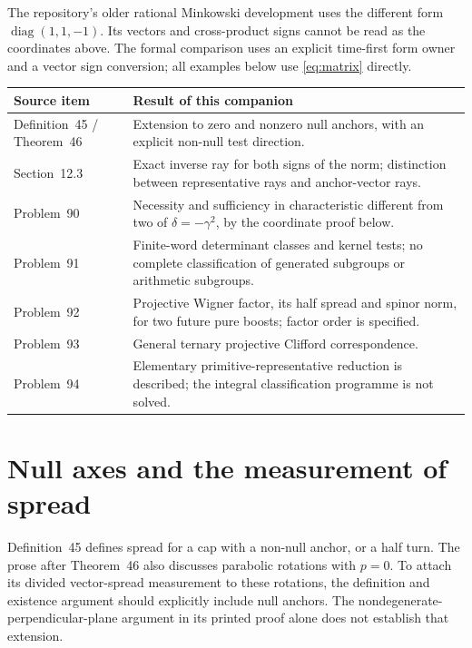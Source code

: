\documentclass[11pt]{article}
\theoremstyle{remark}
\begin{document}
The repository's older rational Minkowski development uses the different
form \(\operatorname{diag}(1,1,-1)\). Its vectors and cross-product signs
cannot be read as the coordinates above. The formal comparison uses an
explicit time-first form owner and a vector sign conversion; all examples
below use \eqref{eq:matrix} directly.

\begin{center}
\begin{tabular}{>{\raggedright\arraybackslash}p{}>{\raggedright\arraybackslash}p{}}
\toprule
Source item & Result of this companion \\
\midrule
Definition~45 / Theorem~46 & Extension to zero and nonzero null anchors,
with an explicit non-null test direction. \\
Section~12.3 & Exact inverse ray for both signs of the norm; distinction
between representative rays and anchor-vector rays. \\
Problem~90 & Necessity and sufficiency in characteristic different from two of
\(\delta=-\gamma^2\), by the coordinate proof below. \\
Problem~91 & Finite-word determinant classes and kernel tests; no complete
classification of generated subgroups or arithmetic subgroups. \\
Problem~92 & Projective Wigner factor, its half spread and spinor norm,
for two future pure boosts; factor order is specified. \\
Problem~93 & General ternary projective Clifford correspondence. \\
Problem~94 & Elementary primitive-representative reduction is described;
the integral classification programme is not solved. \\
\bottomrule
\end{tabular}
\end{center}

\section{Null axes and the measurement of spread}

Definition~45 defines spread for a cap with a non-null anchor, or a half turn.
The prose after Theorem~46 also discusses parabolic rotations with \(p=0\).
To attach its divided vector-spread measurement to these rotations, the
definition and existence argument should explicitly include null anchors.
The nondegenerate-perpendicular-plane argument in its printed proof alone
does not establish that extension.
\end{document}
